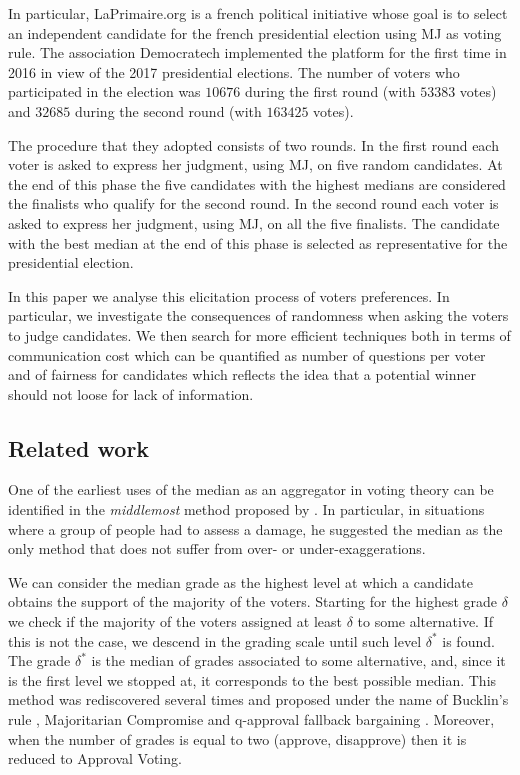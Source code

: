 In particular, LaPrimaire.org \citep{LaPrimaire} is a french political initiative whose goal is to select an independent candidate for the french presidential election using \ac{MJ} as voting rule. The association Democratech implemented the platform for the first time in 2016 in view of the 2017 presidential elections. The number of voters who participated in the election was $10676$ during the first round (with $53383$ votes) and $32685$ during the second round (with $163425$ votes).

The procedure that they adopted consists of two rounds. In the first round each voter is asked to express her judgment, using \ac{MJ}, on five random candidates. At the end of this phase the five candidates with the highest medians are considered the finalists who qualify for the second round. In the second round each voter is asked to express her judgment, using \ac{MJ}, on all the five finalists. The candidate with the best median at the end of this phase is selected as representative for the presidential election.

In this paper we analyse this elicitation process of voters preferences. In particular, we investigate the consequences of randomness when asking the voters to judge candidates. We then search for more efficient techniques both in terms of communication cost \textemdash which can be quantified as number of questions per voter \textemdash and of fairness for candidates \textemdash which reflects the idea that a potential winner should not loose for lack of information.


\subsection{Related work}

One of the earliest uses of the median as an aggregator in voting theory can be identified in the \textit{middlemost} method proposed by \citet{Galton1907a,Galton1907b}. In particular, in situations where a group of people had to assess a damage, he suggested the median as the only method that does not suffer from over- or under-exaggerations.

We can consider the median grade as the highest level at which a candidate obtains the support of the majority of the voters. Starting for the highest grade $\delta$ we check if the majority of the voters assigned at least $\delta$ to some alternative. If this is not the case, we descend in the grading scale until such level $\delta^*$ is found. The grade $\delta^*$ is the median of grades associated to some alternative, and, since it is the first level we stopped at, it corresponds to the best possible median. This method was rediscovered several times and proposed under the name of Bucklin's rule \citep{Hoag1926}, Majoritarian Compromise \citep{Sertel1986,Sertel1999} and q-approval fallback bargaining \citep{Brams2001}. Moreover, when the number of grades is equal to two (approve, disapprove) then it is reduced to Approval Voting.

